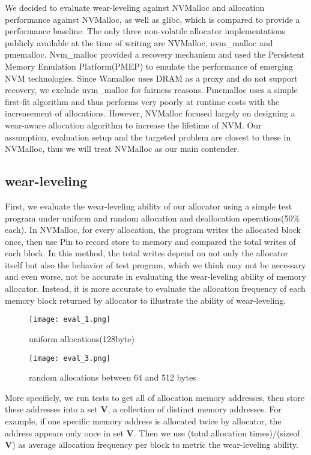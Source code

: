 \documentclass[10pt, conference, compsocconf]{IEEEtran}
\begin{document}
We decided to evaluate wear-leveling against NVMalloc and allocation performance against NVMalloc, as well as glibc,
which is compared to provide a performance baseline. 
The only three non-volatile allocator implementations publicly available at the time of writing are NVMalloc, nvm\_malloc\cite{schwalbnvm} and pmemalloc.
Nvm\_malloc provided a recovery mechanism and used the Persistent Memory Emulation Platform(PMEP)\cite{dulloor2014system} to emulate the performance of emerging NVM technologies.
Since Wamalloc uses DRAM as a proxy and do not support recovery, we exclude nvm\_malloc for fairness reasons.
Pmemalloc uses a simple first-fit algorithm and thus performs very poorly at runtime costs with the increasement of allocations.
However, NVMalloc focused largely on designing a wear-aware allocation algorithm to increase the lifetime of NVM.
Our assumption, evaluation setup and the targeted problem are closest to these in NVMalloc, 
thus we will treat NVMalloc as our main contender.

\subsection{wear-leveling}

First, we evaluate the wear-leveling ability of our allocator
using a simple test program under uniform and random allocation and deallocation operations(50\% each).
In NVMalloc, for every allocation, the program writes the allocated block once, then use Pin\cite{luk2005pin} to record store to memory and compared the total writes of each block.
In this method, the total writes depend on not only the allocator itself but also the behavior of test program,
which we think may not be necessary and even worse, not be accurate in evaluating the wear-leveling ability of memory allocator.
Instead, it is more accurate to evaluate the allocation frequency of each memory block returned by allocator to illustrate the ability of wear-leveling.

\begin{figure}[t]
\centering
\texttt{[image: eval\_1.png]}
\caption{uniform allocations(128byte)}
\label{fig:eval_1}
\end{figure}

\begin{figure}[t]
\centering
\texttt{[image: eval\_3.png]}
\caption{random allocations between 64 and 512 bytes}
\label{fig:eval_3}
\end{figure}

More specificly, we run tests to get all of allocation memory addresses, 
then store these addresses into a set \textbf{V},
a collection of distinct memory addresses.
For example, if one specific memory address is allocated twice by allocator, the address appears only once in set \textbf{V}.
Then we use (total allocation times)/(sizeof \textbf{V}) as average allocation frequency per block to metric the wear-leveling ability.
\end{document}
